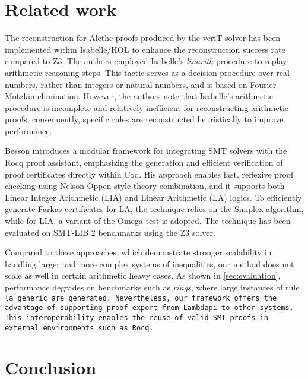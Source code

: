 \documentclass[runningheads]{llncs}
\begin{document}










\section{Related work}
\label{sec:related}

The reconstruction for Alethe proofs produced by the veriT solver has been implemented within Isabelle/HOL to enhance the reconstruction success rate compared to Z3.
The authors employed Isabelle's \emph{linarith} procedure to replay arithmetic reasoning steps. This tactic serves as a decision procedure over real numbers, rather than integers or natural numbers, and is based on Fourier-Motzkin elimination.
However, the authors note that Isabelle's arithmetic procedure is incomplete and relatively inefficient for reconstructing arithmetic proofs; consequently, specific rules are reconstructed heuristically to improve performance.

Besson \cite{micromega} introduces a modular framework for integrating SMT solvers with the Rocq proof assistant, emphasizing the generation and efficient verification of proof certificates directly within Coq.
His approach enables fast, reflexive proof checking using Nelson-Oppen-style theory combination, and it supports both Linear Integer Arithmetic (LIA) and Linear Arithmetic (LA) logics.
To efficiently generate Farkas certificates for LA, the technique relies on the Simplex algorithm, while for LIA, a variant of the Omega test \cite{omegatest} is adopted.
The technique has been evaluated on SMT-LIB 2 benchmarks using the Z3 solver.

Compared to these approaches, which demonstrate stronger scalability in handling larger and more complex systems of inequalities, our method does not scale as well in certain arithmetic heavy cases.
As shown in \cref{sec:evaluation}, performance degrades on benchmarks such as \emph{rings}, where large instances of rule \tt{la\_generic} are generated.
Nevertheless, our framework offers the advantage of supporting proof export from Lambdapi to other systems. This interoperability enables the reuse of valid SMT proofs in external environments such as Rocq.


\section{Conclusion}
\label{sec:conclusion}
\end{document}
